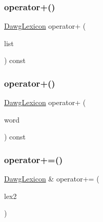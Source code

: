 \subsubsection{\texorpdfstring{operator+()}{operator+()}\hspace{0.1cm}{\footnotesize\ttfamily [2/3]}}
{\footnotesize\ttfamily \mbox{\hyperlink{classDawgLexicon}{Dawg\+Lexicon}} operator+ (\begin{DoxyParamCaption}\item[{std\+::initializer\+\_\+list$<$ std\+::string $>$}]{list }\end{DoxyParamCaption}) const}

\mbox{\label{classDawgLexicon_a218cb40b0674a3db9a362e5b878f7bce}} 
\subsubsection{\texorpdfstring{operator+()}{operator+()}\hspace{0.1cm}{\footnotesize\ttfamily [3/3]}}
{\footnotesize\ttfamily \mbox{\hyperlink{classDawgLexicon}{Dawg\+Lexicon}} operator+ (\begin{DoxyParamCaption}\item[{const std\+::string \&}]{word }\end{DoxyParamCaption}) const}

\mbox{\label{classDawgLexicon_a4f69eb7a84edf9a91861e7083305e501}} 
\subsubsection{\texorpdfstring{operator+=()}{operator+=()}\hspace{0.1cm}{\footnotesize\ttfamily [1/3]}}
{\footnotesize\ttfamily \mbox{\hyperlink{classDawgLexicon}{Dawg\+Lexicon}} \& operator+= (\begin{DoxyParamCaption}\item[{const \mbox{\hyperlink{classDawgLexicon}{Dawg\+Lexicon}} \&}]{lex2 }\end{DoxyParamCaption})}

\mbox{\label{classDawgLexicon_a30565b5b4fdd5efeb9c11fb1943a1d90}} 
